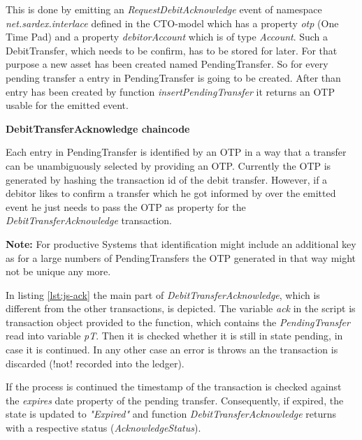 This is done by emitting an \textit{RequestDebitAcknowledge} event of namespace \textit{net.sardex.interlace} defined in the CTO-model which has a property \textit{otp} (One Time Pad) and a property \textit{debitorAccount} which is of type \textit{Account}. Such a DebitTransfer, which needs to be confirm, has to be stored for later. For that purpose a new asset has been created named PendingTransfer. So for every pending transfer a entry in PendingTransfer is going to be created. After than entry has been created by function \textit{insertPendingTransfer} it returns an OTP usable for the emitted event.

\textbf{DebitTransferAcknowledge chaincode}

Each entry in PendingTransfer is identified by an OTP in a way that a transfer can be unambiguously selected by providing an OTP. Currently the OTP is generated by hashing the transaction id of the debit transfer. However, if a debitor likes to confirm a transfer which he got informed by over the emitted event he just needs to pass the OTP as property for the \textit{DebitTransferAcknowledge} transaction.

\textbf{Note:} For productive Systems that identification might include an additional key as for a large numbers of PendingTransfers the OTP generated in that way might not be unique any more.

In listing \ref{lst:js-ack} the main part of \textit{DebitTransferAcknowledge}, which is different from the other transactions, is depicted. The variable \textit{ack} in the script is transaction object provided to the function, which contains the \textit{PendingTransfer} read into variable \textit{pT}. Then it is checked whether it is still in state pending, in case it is continued. In any other case an error is throws an the transaction is discarded (!not! recorded into the ledger).

If the process is continued the timestamp of the transaction is checked against the \textit{expires} date property of the pending transfer. Consequently, if expired, the state is updated to \textit{"Expired"} and function \textit{DebitTransferAcknowledge} returns with a respective status (\textit{AcknowledgeStatus}).

